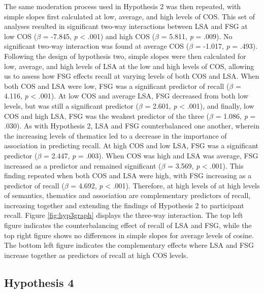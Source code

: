 \documentclass[english,man]{apa6}
\theoremstyle{definition}
\theoremstyle{definition}
\theoremstyle{definition}
\theoremstyle{remark}
\begin{document}
The same moderation process used in Hypothesis 2 was then repeated, with
simple slopes first calculated at low, average, and high levels of COS.
This set of analyses resulted in significant two-way interactions
between LSA and FSG at low COS (\(\beta\) = -7.845, \emph{p} \textless{}
.001) and high COS (\(\beta\) = 5.811, \emph{p} = .009). No significant
two-way interaction was found at average COS (\(\beta\) = -1.017,
\emph{p} = .493). Following the design of hypothesis two, simple slopes
were then calculated for low, average, and high levels of LSA at the low
and high levels of COS, allowing us to assess how FSG effects recall at
varying levels of both COS and LSA. When both COS and LSA were low, FSG
was a significant predictor of recall (\(\beta\) = 4.116, \emph{p}
\textless{} .001). At low COS and average LSA, FSG decreased from both
low levels, but was still a significant predictor (\(\beta\) = 2.601,
\emph{p} \textless{} .001), and finally, low COS and high LSA, FSG was
the weakest predictor of the three (\(\beta\) = 1.086, \emph{p} = .030).
As with Hypothesis 2, LSA and FSG counterbalanced one another, wherein
the increasing levels of thematics led to a decrease in the importance
of association in predicting recall. At high COS and low LSA, FSG was a
significant predictor (\(\beta\) = 2.447, \emph{p} = .003). When COS was
high and LSA was average, FSG increased as a predictor and remained
significant (\(\beta\) = 3.569, \emph{p} \textless{} .001). This finding
repeated when both COS and LSA were high, with FSG increasing as a
predictor of recall (\(\beta\) = 4.692, \emph{p} \textless{} .001).
Therefore, at high levels of at high levels of semantics, thematics and
association are complementary predictors of recall, increasing together
and extending the findings of Hypothesis 2 to participant recall. Figure
\ref{fig:hyp3graph} displays the three-way interaction. The top left
figure indicates the counterbalancing effect of recall of LSA and FSG,
while the top right figure shows no differences in simple slopes for
average levels of cosine. The bottom left figure indicates the
complementary effects where LSA and FSG increase together as predictors
of recall at high COS levels.

\subsection{Hypothesis 4}\label{hypothesis-4}
\end{document}
